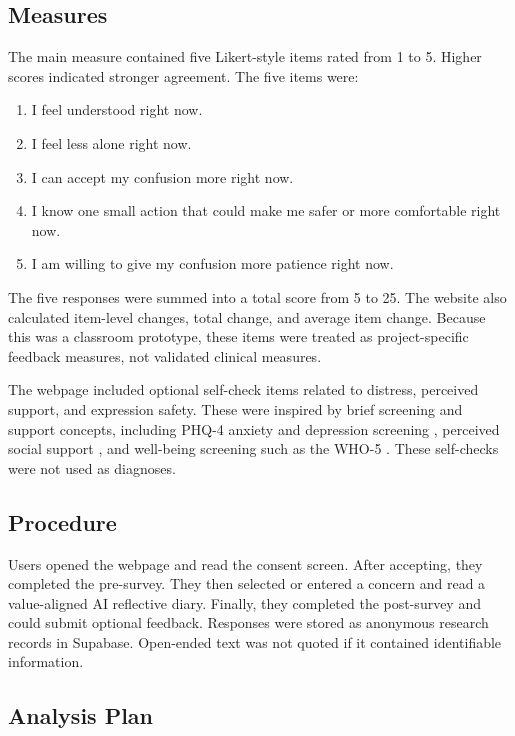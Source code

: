 \subsection{Measures}

The main measure contained five Likert-style items rated from 1 to 5. Higher scores indicated stronger agreement. The five items were:

\begin{enumerate}
    \item I feel understood right now.
    \item I feel less alone right now.
    \item I can accept my confusion more right now.
    \item I know one small action that could make me safer or more comfortable right now.
    \item I am willing to give my confusion more patience right now.
\end{enumerate}

The five responses were summed into a total score from 5 to 25. The website also calculated item-level changes, total change, and average item change. Because this was a classroom prototype, these items were treated as project-specific feedback measures, not validated clinical measures.

The webpage included optional self-check items related to distress, perceived support, and expression safety. These were inspired by brief screening and support concepts, including PHQ-4 anxiety and depression screening \parencite{kroenke2009, phq_screeners}, perceived social support \parencite{zimet1988}, and well-being screening such as the WHO-5 \parencite{topp2015}. These self-checks were not used as diagnoses.

\subsection{Procedure}

Users opened the webpage and read the consent screen. After accepting, they completed the pre-survey. They then selected or entered a concern and read a value-aligned AI reflective diary. Finally, they completed the post-survey and could submit optional feedback. Responses were stored as anonymous research records in Supabase. Open-ended text was not quoted if it contained identifiable information.

\subsection{Analysis Plan}


